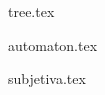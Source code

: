 \documentclass[11pt,oneside,a4paper, openany]{book}
\begin{document}

{tree.tex}





{automaton.tex}

{subjetiva.tex}

\newpage
\printbibliography
\end{document}
